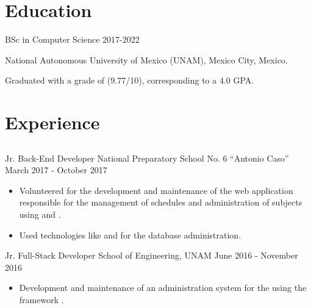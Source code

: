 \documentclass{resume}
\begin{document}
  \begin{paracol}{2}
    
    \section{Education}
      
      \datedsubsection%
        {BSc in Computer Science}
        {2017-2022}
        
        \noindent
        National Autonomous University of Mexico (UNAM), \newline Mexico City,
        Mexico.

        \vspace{0.5em}
        
        \noindent
        Graduated with a grade of (9.77/10), corresponding to a 4.0 GPA. 

        \noindent

    \section{Experience}
    
      \subsection{\large{}}

      \experience%
          {Jr. Back-End Developer}
          {National Preparatory School No. 6 ``Antonio Caso''}
          {March 2017 - October 2017}
          {
            \begin{itemize}
            \item
              Volunteered for the development and maintenance of the web
              application responsible for the management of schedules and
              administration of subjects using  and .
              
            \item
              Used technologies like  and  for the
              database administration.
            \end{itemize}
          }
        
      \experience%
          {Jr. Full-Stack Developer}
          {School of Engineering, UNAM}
          {June 2016 - November 2016}
          {
            \begin{itemize}
              \item Development and maintenance of an administration system for
                the 
                using the framework .
                

\end{itemize}}
\end{paracol}
\end{document}
